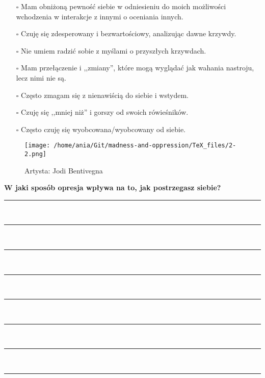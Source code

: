 \begin{multicols}{2}
\begin{itemize}
\item[$\square$]{Mam obniżoną pewność siebie w odniesieniu do moich możliwości wchodzenia w interakcje z innymi o oceniania innych.}
\item[$\square$]{Czuję się zdesperowany i bezwartościowy, analizując dawne krzywdy.}
\item[$\square$]{Nie umiem radzić sobie z myślami o przyszłych krzywdach.}
\item[$\square$]{Mam przełączenie i ,,zmiany'', które mogą wyglądać jak wahania nastroju, lecz nimi nie są.}
\item[$\square$]{Często zmagam się z nienawiścią do siebie i wstydem.}
\item[$\square$]{Czuję się ,,mniej niż'' i gorszy od swoich rówieśników.}
\item[$\square$]{Często czuję się wyobcowana/wyobcowany od siebie.}
\end{itemize}
\end{multicols}

\begin{figure}[h]
\centering
\texttt{[image: /home/ania/Git/madness-and-oppression/TeX\_files/2-2.png]}
\caption{Artysta: Jodi Bentivegna}
\label{2-2}
\end{figure}

\newpage
\noindent
\textcolor{ProcessBlue}{\textbf{\Large{W jaki sposób opresja wpływa na to, jak postrzegasz siebie?}}}\\
\noindent\rule{\textwidth}{1pt}\\
\noindent\rule{\textwidth}{1pt}\\
\noindent\rule{\textwidth}{1pt}\\
\noindent\rule{\textwidth}{1pt}\\
\noindent\rule{\textwidth}{1pt}\\
\noindent\rule{\textwidth}{1pt}\\
\noindent\rule{\textwidth}{1pt}\\
\noindent\rule{\textwidth}{1pt}\\\\

